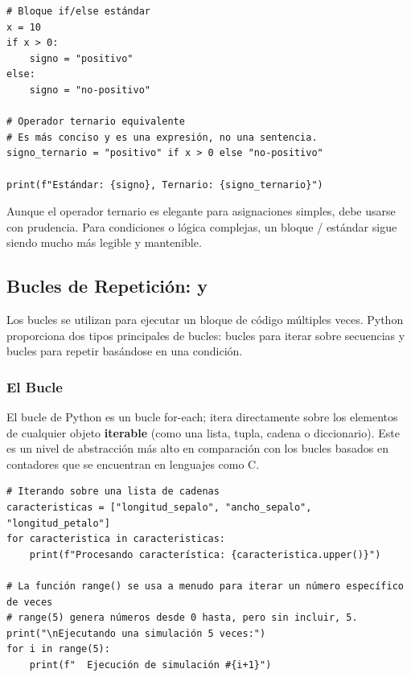 \text{ }\begin{verbatim}
# Bloque if/else estándar
x = 10
if x > 0:
    signo = "positivo"
else:
    signo = "no-positivo"

# Operador ternario equivalente
# Es más conciso y es una expresión, no una sentencia.
signo_ternario = "positivo" if x > 0 else "no-positivo"

print(f"Estándar: {signo}, Ternario: {signo_ternario}")
\end{verbatim}
\begin{remark}
Aunque el operador ternario es elegante para asignaciones simples, debe usarse con prudencia. Para condiciones o lógica complejas, un bloque / estándar sigue siendo mucho más legible y mantenible.
\end{remark}

\subsection{Bucles de Repetición:  y }
\label{subsec:loops}
Los bucles se utilizan para ejecutar un bloque de código múltiples veces. Python proporciona dos tipos principales de bucles: bucles  para iterar sobre secuencias y bucles  para repetir basándose en una condición.

\subsubsection*{El Bucle }
El bucle  de Python es un bucle for-each; itera directamente sobre los elementos de cualquier objeto \textbf{iterable} (como una lista, tupla, cadena o diccionario). Este es un nivel de abstracción más alto en comparación con los bucles basados en contadores que se encuentran en lenguajes como C.

\text{ }\begin{verbatim}
# Iterando sobre una lista de cadenas
caracteristicas = ["longitud_sepalo", "ancho_sepalo", "longitud_petalo"]
for caracteristica in caracteristicas:
    print(f"Procesando característica: {caracteristica.upper()}")

# La función range() se usa a menudo para iterar un número específico de veces
# range(5) genera números desde 0 hasta, pero sin incluir, 5.
print("\nEjecutando una simulación 5 veces:")
for i in range(5):
    print(f"  Ejecución de simulación #{i+1}")
\end{verbatim}

